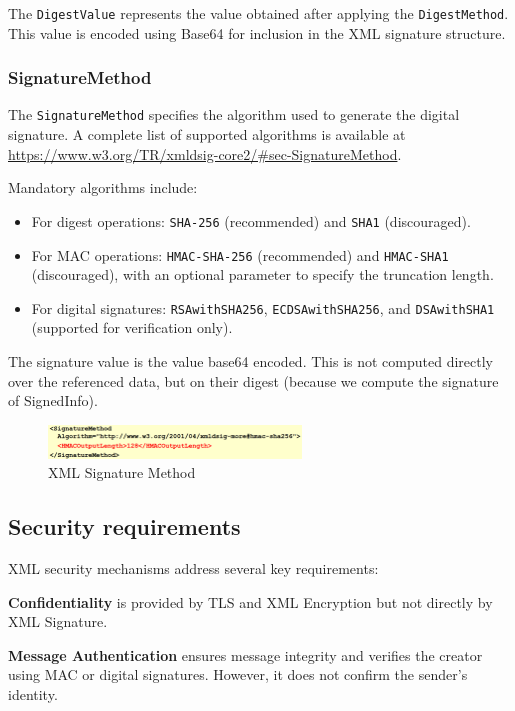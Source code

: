 The \texttt{DigestValue} represents the value obtained after applying
the \texttt{DigestMethod}. This value is encoded using Base64 for
inclusion in the XML signature structure.

\subsubsection{SignatureMethod}

The \texttt{SignatureMethod} specifies the algorithm used to generate
the digital signature. A complete list of supported algorithms is
available at
\url{https://www.w3.org/TR/xmldsig-core2/\#sec-SignatureMethod}.

Mandatory algorithms include:
\begin{itemize}
  \item For digest operations: \texttt{SHA-256} (recommended) and
    \texttt{SHA1} (discouraged).
  \item For MAC operations: \texttt{HMAC-SHA-256} (recommended) and
    \texttt{HMAC-SHA1} (discouraged), with an optional parameter to
    specify the truncation length.
  \item For digital signatures: \texttt{RSAwithSHA256},
    \texttt{ECDSAwithSHA256}, and \texttt{DSAwithSHA1} (supported
    for verification only).
\end{itemize}

The signature value is the value base64 encoded. This is not computed
directly over the referenced data, but on their digest (because we
compute the signature of SignedInfo).

\begin{figure}[H]
  \centering
  \includegraphics[width=0.6\textwidth]{img/xml signature value.png}
  \caption{XML Signature Method}
\end{figure}

\subsection{Security requirements}
XML security mechanisms address several key requirements:

\textbf{Confidentiality} is provided by TLS and XML Encryption but not
directly by XML Signature.

\textbf{Message Authentication} ensures message integrity and verifies
the creator using MAC or digital signatures. However, it does not
confirm the sender's identity.

